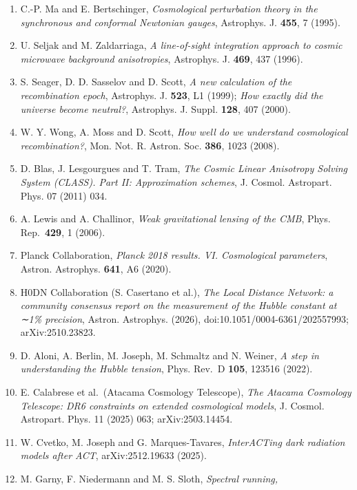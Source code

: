 \documentclass[
  10pt,
]{article}
\providecommand{\tightlist}{%
  \setlength{\itemsep}{0pt}\setlength{\parskip}{0pt}}
\begin{document}
\begin{enumerate}
\def\labelenumi{\arabic{enumi}.}
\tightlist
\item
  C.-P. Ma and E. Bertschinger, \emph{Cosmological perturbation theory
  in the synchronous and conformal Newtonian gauges}, Astrophys. J.
  \textbf{455}, 7 (1995).
\item
  U. Seljak and M. Zaldarriaga, \emph{A line-of-sight integration
  approach to cosmic microwave background anisotropies}, Astrophys. J.
  \textbf{469}, 437 (1996).
\item
  S. Seager, D. D. Sasselov and D. Scott, \emph{A new calculation of the
  recombination epoch}, Astrophys. J. \textbf{523}, L1 (1999); \emph{How
  exactly did the universe become neutral?}, Astrophys. J. Suppl.
  \textbf{128}, 407 (2000).
\item
  W. Y. Wong, A. Moss and D. Scott, \emph{How well do we understand
  cosmological recombination?}, Mon. Not. R. Astron. Soc. \textbf{386},
  1023 (2008).
\item
  D. Blas, J. Lesgourgues and T. Tram, \emph{The Cosmic Linear
  Anisotropy Solving System (CLASS). Part II: Approximation schemes}, J.
  Cosmol. Astropart. Phys. 07 (2011) 034.
\item
  A. Lewis and A. Challinor, \emph{Weak gravitational lensing of the
  CMB}, Phys. Rep.~\textbf{429}, 1 (2006).
\item
  Planck Collaboration, \emph{Planck 2018 results. VI. Cosmological
  parameters}, Astron. Astrophys. \textbf{641}, A6 (2020).
\item
  H0DN Collaboration (S. Casertano et al.), \emph{The Local Distance
  Network: a community consensus report on the measurement of the Hubble
  constant at ∼1\% precision}, Astron. Astrophys. (2026),
  doi:10.1051/0004-6361/202557993; arXiv:2510.23823.
\item
  D. Aloni, A. Berlin, M. Joseph, M. Schmaltz and N. Weiner, \emph{A
  step in understanding the Hubble tension}, Phys. Rev.~D \textbf{105},
  123516 (2022).
\item
  E. Calabrese et al.~(Atacama Cosmology Telescope), \emph{The Atacama
  Cosmology Telescope: DR6 constraints on extended cosmological models},
  J. Cosmol. Astropart. Phys. 11 (2025) 063; arXiv:2503.14454.
\item
  W. Cvetko, M. Joseph and G. Marques-Tavares, \emph{InterACTing dark
  radiation models after ACT}, arXiv:2512.19633 (2025).
\item
  M. Garny, F. Niedermann and M. S. Sloth, \emph{Spectral running,
}
\end{enumerate}
\end{document}
